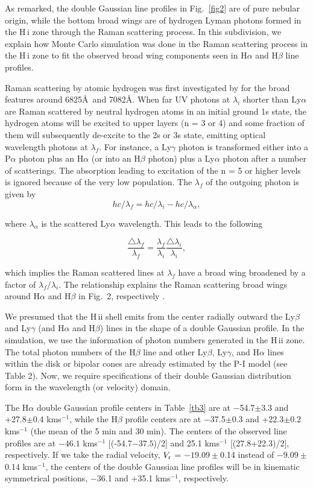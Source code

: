 \documentclass[a4paper,fleqn,usenatbib,useAMS]{mnras}
\def\ha{H{$\alpha$}}
\def\hb{H{$\beta$}}
\def\hi{H\,{\sc i}}
\def\hii{H\,{\sc ii}}
\def\kms{km\hspace{1pt}s$^{-1}$}
\begin{document}
{As remarked, the  double Gaussian line profiles in Fig.~\ref{fig2} are of pure nebular origin, while the bottom broad wings are of hydrogen Lyman photons formed in the {\hi} zone through the Raman scattering process. In this subdivision, we explain how Monte Carlo simulation was done in the Raman scattering process in the {\hi} zone to fit the observed broad wing components seen in {\ha} and {\hb} line profiles.

Raman scattering by atomic hydrogen was first investigated by \citet{sch89} for the broad features around 6825\AA\, and 7082\AA. When far UV photons at $\lambda_i$ shorter than Ly$\alpha$ are Raman scattered by neutral hydrogen atoms in an initial ground 1s state, the hydrogen atoms will be excited to upper layers {(n = 3 or 4)} and some fraction of them will subsequently de-excite to the 2s or 3s state, emitting optical wavelength photons at $\lambda_f$.
{For instance, a Ly$\gamma$ photon is transformed either into a P$\alpha$ photon plus an {\ha} (or into an {\hb} photon) plus a Ly$\alpha$ photon after a number of scatterings.
The absorption leading to excitation of the n = 5 or higher levels is ignored because of the very low population.}
The $\lambda_f$ of the outgoing photon is given by
$$
hc/\lambda_{f} = hc/\lambda_{i} - hc/\lambda_{\alpha},
$$

\noindent where $\lambda_{\alpha}$ is the scattered Ly$\alpha$ wavelength. This  leads to the following

$$
\frac{\triangle\lambda_f}{\lambda_f}
=
\frac{\lambda_f}{\lambda_i}\frac{\triangle\lambda_i}{\lambda_i},
$$

\noindent which implies the Raman scattered lines at $\lambda_f$ have a broad wing broadened by a factor of ${\lambda_f}/{\lambda_i}$. The relationship explains the Raman scattering broad wings around {\ha} and {\hb} in Fig.~2, respectively \citep{cha15, lee03, leh00, lee97}.

We presumed that the {\hii} shell emits from the center radially outward the Ly$\beta$ and Ly$\gamma$ (and {\ha} and {\hb}) lines in the shape of a double Gaussian profile. In the simulation, we use the information of photon numbers generated in the {\hii} zone. The total photon numbers of the {\hb} line and other Ly$\beta$, Ly$\gamma$, and {\ha} lines within the disk or bipolar cones are already estimated by the P-I model (see  Table 2). Now, we require specifications of their double Gaussian distribution form in the wavelength (or velocity) domain.

The {\ha} double Gaussian profile centers in Table~\ref{tb3} are at $-$54.7$\pm$3.3 and +27.8$\pm$0.4 {\kms}, while the {\hb} profile centers are at $-$37.5$\pm$0.3 and +22.3$\pm$0.2 {\kms} (the mean of the 5 min and 30 min).
The centers of the observed line profiles are at $-46.1$ {\kms} [(-54.7$-37.5$)/2] and 25.1 {\kms} [(27.8+22.3)/2], respectively. If we take the radial velocity, $V_{\rm r} $ = $-19.09\pm$0.14 instead of $-9.09\pm$0.14 {\kms}, the centers of the double Gaussian line profiles will be in kinematic symmetrical positions, $-$36.1 and +35.1 {\kms}, respectively.

}
\end{document}
